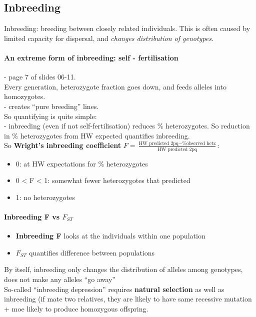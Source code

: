 \documentclass{scrartcl}
\begin{document}
\subsection{Inbreeding}
\label{sec:06-6}
Inbreeding: breeding between closely related individuals.
This is often caused by limited capacity for dispersal, and {\em changes distribution of genotypes}.\\

\paragraph{An extreme form of inbreeding: self - fertilisation}
- page 7 of slides 06-11.\\
Every generation, heterozygote fraction goes down, and feeds alleles into homozygotes.\\
- creates ``pure breeding'' lines.\\
So quantifying is quite simple:\\
- inbreeding (even if not self-fertilisation) reduces \% heterozygotes.
So reduction in \% heterozygotes from HW expected quantifies inbreeding.\\
So {\bf Wright's inbreeding coefficient } $F = \frac{\text{HW predicted 2pq} - \text{\% observed hetz}}{\text{HW predicted 2pq}}$:
\begin{itemize}
\item 0: at HW expectations for \% heterozygotes
\item 0 < F < 1: somewhat fewer heterozygotes that predicted
\item 1: no heterozygotes
\end{itemize}

\paragraph{Inbreeding F vs $F_{ST}$}
\begin{itemize}
\item {\bf Inbreeding F } looks at the individuals within one population
\item {\bf $F_{ST}$ } quantifies difference between populations
\end{itemize}
By itself, inbreeding only changes the distribution of alleles among genotypes, does not make any alleles ``go away''\\
So-called ``inbreeding depression'' requires {\bf natural selection } as well as inbreeding (if mate two relatives, they are likely to have same recessive mutation + moe likely to produce homozygous offspring.
\end{document}
